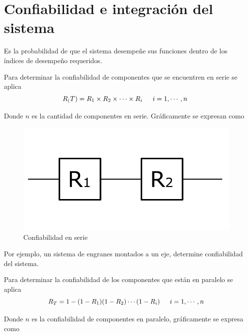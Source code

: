 \section{Confiabilidad e integración del sistema}

Es la probabilidad de que el sistema desempeñe sus funciones dentro de los índices de desempeño requeridos. 

Para determinar la confiabilidad de componentes que se encuentren en serie se aplica
\[
    R_(T) = R_{1} \times R_{2} \times \cdots \times R_{i} \text{ \;\;\; \( i = 1, \cdots, n \) }
\]

Donde \( n \) es la cantidad de componentes en serie. Gráficamente se expresan como

\begin{figure}[h!]
    \centering
        \includegraphics[scale=0.20]{Proyecto Integrador Figuras/24 Confiabilidad Serie.png}
        \caption{Confiabilidad en serie}
\end{figure}

Por ejemplo, un sistema de engranes montados a un eje, determine confiabilidad del sistema.

Para determinar la confiabilidad de los componentes que están en paralelo se aplica
\[
    R_{T} = 1 - (1 - R_{1}) (1 - R_{2}) \cdots (1 - R_{i}) \text{ \;\;\; \( i = 1, \cdots, n \)}
\]

Donde \( n \) es la confiabilidad de componentes en paralelo, gráficamente se expresa como

